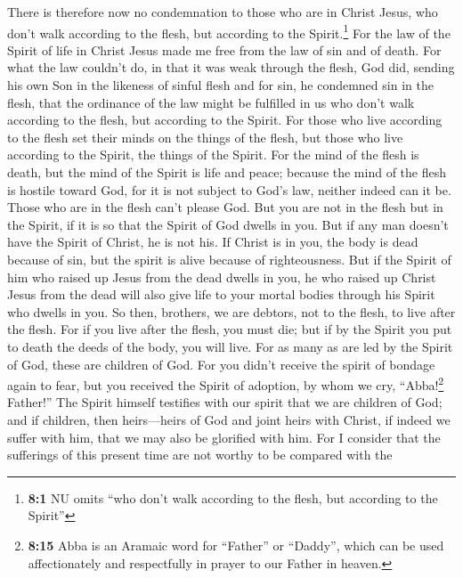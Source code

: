  There is therefore now no condemnation to those who are
in Christ Jesus, who don't walk according to the flesh, but according to
the Spirit.\footnote{\textbf{8:1} NU omits ``who don't walk according to
  the flesh, but according to the Spirit''}  For the law
of the Spirit of life in Christ Jesus made me free from the law of sin
and of death.  For what the law couldn't do, in that it
was weak through the flesh, God did, sending his own Son in the likeness
of sinful flesh and for sin, he condemned sin in the flesh,
 that the ordinance of the law might be fulfilled in us
who don't walk according to the flesh, but according to the Spirit.
 For those who live according to the flesh set their minds
on the things of the flesh, but those who live according to the Spirit,
the things of the Spirit.  For the mind of the flesh is
death, but the mind of the Spirit is life and peace; 
because the mind of the flesh is hostile toward God, for it is not
subject to God's law, neither indeed can it be.  Those who
are in the flesh can't please God.  But you are not in the
flesh but in the Spirit, if it is so that the Spirit of God dwells in
you. But if any man doesn't have the Spirit of Christ, he is not his.
 If Christ is in you, the body is dead because of sin,
but the spirit is alive because of righteousness.  But if
the Spirit of him who raised up Jesus from the dead dwells in you, he
who raised up Christ Jesus from the dead will also give life to your
mortal bodies through his Spirit who dwells in you.  So
then, brothers, we are debtors, not to the flesh, to live after the
flesh.  For if you live after the flesh, you must die;
but if by the Spirit you put to death the deeds of the body, you will
live.  For as many as are led by the Spirit of God, these
are children of God.  For you didn't receive the spirit
of bondage again to fear, but you received the Spirit of adoption, by
whom we cry, ``Abba!\footnote{\textbf{8:15} Abba is an Aramaic word for
  ``Father'' or ``Daddy'', which can be used affectionately and
  respectfully in prayer to our Father in heaven.} Father!''
 The Spirit himself testifies with our spirit that we are
children of God;  and if children, then heirs---heirs of
God and joint heirs with Christ, if indeed we suffer with him, that we
may also be glorified with him.  For I consider that the
sufferings of this present time are not worthy to be compared with the
